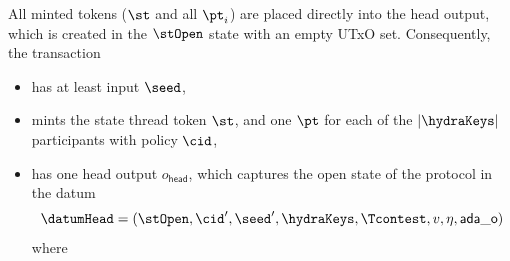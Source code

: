 \noindent All minted tokens ($\st$ and all $\pt_{i}$) are placed directly into
the head output, which is created in the $\stOpen$ state with an empty UTxO set.
Consequently, the \mtxInit{} transaction
\begin{itemize}
	\item has at least input $\seed$,
	\item mints the state thread token $\st$, and one $\pt$ for each of the $|\hydraKeys|$
	      participants with policy $\cid$,
	\item has one head output
	      $o_{\mathsf{head}}$, which captures
	      the open state of the protocol in the datum
	      \[
		      \datumHead = (\stOpen,\cid',\seed',\hydraKeys,\Tcontest,v,\eta,\mathsf{ada\_o})
	      \]
	      where
\end{itemize}

